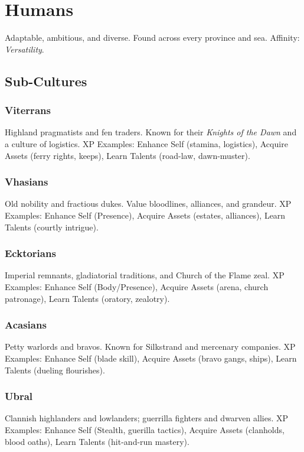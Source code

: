 \documentclass[11pt]{article}
\begin{document}
\section{Humans}
Adaptable, ambitious, and diverse. Found across every province and sea.  
Affinity: \emph{Versatility}.  

\subsection{Sub-Cultures}
\subsubsection{Viterrans}
Highland pragmatists and fen traders. Known for their \emph{Knights of the Dawn} and a culture of logistics.  
XP Examples: Enhance Self (stamina, logistics), Acquire Assets (ferry rights, keeps), Learn Talents (road-law, dawn-muster).  

\subsubsection{Vhasians}
Old nobility and fractious dukes. Value bloodlines, alliances, and grandeur.  
XP Examples: Enhance Self (Presence), Acquire Assets (estates, alliances), Learn Talents (courtly intrigue).  

\subsubsection{Ecktorians}
Imperial remnants, gladiatorial traditions, and Church of the Flame zeal.  
XP Examples: Enhance Self (Body/Presence), Acquire Assets (arena, church patronage), Learn Talents (oratory, zealotry).  

\subsubsection{Acasians}
Petty warlords and bravos. Known for Silkstrand and mercenary companies.  
XP Examples: Enhance Self (blade skill), Acquire Assets (bravo gangs, ships), Learn Talents (dueling flourishes).  

\subsubsection{Ubral}
Clannish highlanders and lowlanders; guerrilla fighters and dwarven allies.  
XP Examples: Enhance Self (Stealth, guerilla tactics), Acquire Assets (clanholds, blood oaths), Learn Talents (hit-and-run mastery).  
\end{document}
